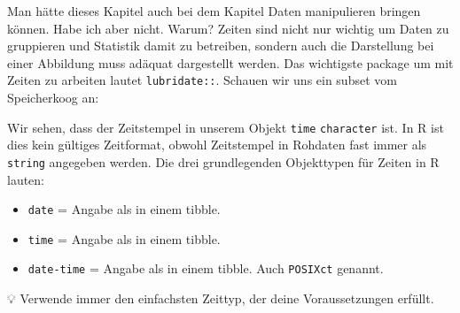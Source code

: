 \documentclass[
]{article}
\newenvironment{Shaded}{\begin{snugshade}}{\end{snugshade}}
\newcommand{\AttributeTok}[1]{\textcolor[rgb]{0.77,0.63,0.00}{#1}}
\newcommand{\DecValTok}[1]{\textcolor[rgb]{0.00,0.00,0.81}{#1}}
\newcommand{\DocumentationTok}[1]{\textcolor[rgb]{0.56,0.35,0.01}{\textbf{\textit{#1}}}}
\newcommand{\FunctionTok}[1]{\textcolor[rgb]{0.00,0.00,0.00}{#1}}
\newcommand{\NormalTok}[1]{#1}
\newcommand{\OtherTok}[1]{\textcolor[rgb]{0.56,0.35,0.01}{#1}}
\newcommand{\SpecialCharTok}[1]{\textcolor[rgb]{0.00,0.00,0.00}{#1}}
\newcommand{\StringTok}[1]{\textcolor[rgb]{0.31,0.60,0.02}{#1}}
\providecommand{\tightlist}{%
  \setlength{\itemsep}{0pt}\setlength{\parskip}{0pt}}
\begin{document}
Man hätte dieses Kapitel auch bei dem Kapitel Daten manipulieren bringen können. Habe ich aber nicht. Warum? Zeiten sind nicht nur wichtig um Daten zu gruppieren und Statistik damit zu betreiben, sondern auch die Darstellung bei einer Abbildung muss adäquat dargestellt werden. Das wichtigste package um mit Zeiten zu arbeiten lautet \texttt{lubridate::}. Schauen wir uns ein subset vom Speicherkoog an:

\begin{Shaded}
\end{Shaded}

Wir sehen, dass der Zeitstempel in unserem Objekt \texttt{time} \texttt{character} ist. In R ist dies kein gültiges Zeitformat, obwohl Zeitstempel in Rohdaten fast immer als \texttt{string} angegeben werden. Die drei grundlegenden Objekttypen für Zeiten in R lauten:

\begin{itemize}
\tightlist
\item
  \texttt{date} = Angabe als in einem tibble.
\item
  \texttt{time} = Angabe als in einem tibble.
\item
  \texttt{date-time} = Angabe als in einem tibble. Auch \texttt{POSIXct} genannt.
\end{itemize}

💡 Verwende immer den einfachsten Zeittyp, der deine Voraussetzungen erfüllt.
\end{document}

